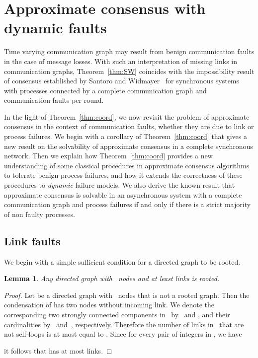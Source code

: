 \documentclass[a4paper]{article}
\theoremstyle{newthm}
\newtheorem{lem}[thm]{Lemma}
\begin{document}
		
\section{Approximate consensus with dynamic faults}

Time varying communication graph may result from benign communication faults in the
	case of message losses.
With such an interpretation of missing links in  communication graphs, Theorem~\ref{thm:SW} 
	coincides with the impossibility result of consensus established by Santoro and Widmayer~\cite{SW89}
	for synchronous systems with  processes connected by  a complete communication graph and 
	 communication faults per round.

In the light of Theorem~\ref{thm:coord}, we now revisit the problem of approximate consensus in the
	context of communication faults, whether they are due to  link or process failures.
We begin with a corollary of Theorem~\ref{thm:coord} that gives a new result  on the solvability 
	of approximate consensus in a complete synchronous network.
Then we explain how Theorem~\ref{thm:coord} provides a new understanding of some classical procedures 
	in approximate consensus algorithms to tolerate  benign process failures, and how it extends
	the  correctness of these procedures to {\em dynamic}  failure models.
We also derive the known result that approximate consensus is solvable in an asynchronous system
	with a complete communication graph and process failures if and only if there is a strict majority of non faulty
	processes.

	
\subsection{Link faults}

We begin with a simple sufficient condition for a directed graph to be rooted.
 
\begin{lem}\label{lem:2n-2}
Any directed graph with~ nodes and  at
	least  links is rooted.
\end{lem}
\begin{proof}
Let  be a directed graph with~ nodes that  is not a rooted graph.
Then the condensation of  has   two nodes  without incoming link.
We denote the corresponding two strongly connected components in~ by~ and ,
	and their cardinalities by~ and~, respectively.
Therefore the number of links in~ that are not self-loops is at most equal to .
Since  for every pair of  integers  in , we have
	
	 it follows that  has at most   links.
\end{proof}
\end{document}
